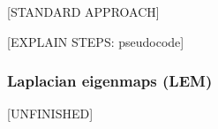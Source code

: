 
%
%
% 
%


[STANDARD APPROACH]

[EXPLAIN STEPS: pseudocode]






\hfill
\subsubsection{Laplacian eigenmaps (LEM)}
[UNFINISHED]

